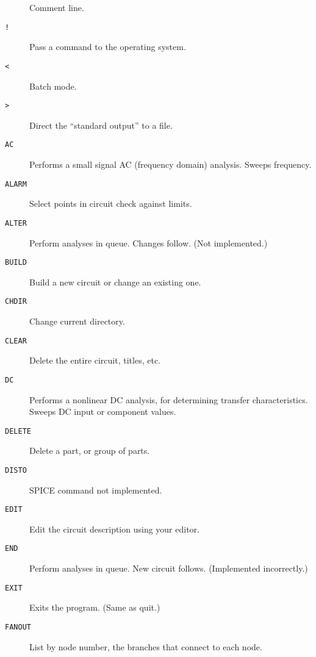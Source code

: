 \begin{description}

\item[{\tt *}] Comment line.

\item[{\tt !}] Pass a command to the operating system.

\item[{\tt <}] Batch mode.

\item[{\tt >}] Direct the ``standard output'' to a file.

\item[{\tt AC}] Performs a small signal AC (frequency domain) analysis.
Sweeps frequency.

\item[{\tt ALARM}] Select points in circuit check against limits.

\item[{\tt ALTER}] Perform analyses in queue.  Changes follow.  (Not
implemented.)

\item[{\tt BUILD}] Build a new circuit or change an existing one.

\item[{\tt CHDIR}] Change current directory.

\item[{\tt CLEAR}] Delete the entire circuit, titles, etc.

\item[{\tt DC}] Performs a nonlinear DC analysis, for determining transfer
characteristics.  Sweeps DC input or component values.

\item[{\tt DELETE}] Delete a part, or group of parts.

\item[{\tt DISTO}] SPICE command not implemented.

\item[{\tt EDIT}] Edit the circuit description using your editor.

\item[{\tt END}] Perform analyses in queue.  New circuit follows.
(Implemented incorrectly.)

\item[{\tt EXIT}] Exits the program.  (Same as quit.)

\item[{\tt FANOUT}] List by node number, the branches that connect to each
node.


\end{description}
